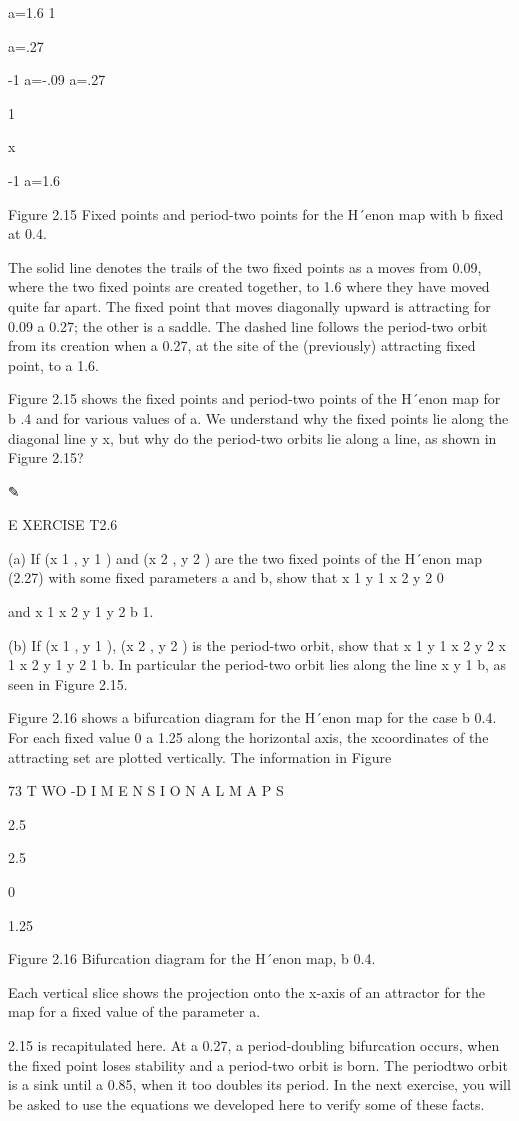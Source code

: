\documentclass[12pt]{article}
\begin{document}
a=1.6 1

a=.27

-1 a=-.09 a=.27

1

x

-1 a=1.6

Figure 2.15 Fixed points and period-two points for the H´enon map with b ﬁxed at 0.4.

The solid line denotes the trails of the two ﬁxed points as a moves from 0.09, where the two ﬁxed points are created together, to 
1.6 where they have moved quite far apart. The ﬁxed point that moves diagonally upward is attracting for 0.09  a  0.27; the other is 
a saddle. The dashed line follows the period-two orbit from its creation when a  0.27, at the site of the (previously) attracting 
ﬁxed point, to a  1.6.

Figure 2.15 shows the ﬁxed points and period-two points of the H´enon map for b  .4 and for various values of a. We understand why 
the ﬁxed points lie along the diagonal line y  x, but why do the period-two orbits lie along a line, as shown in Figure 2.15?

✎

E XERCISE T2.6

(a) If (x 1 , y 1 ) and (x 2 , y 2 ) are the two ﬁxed points of the H´enon map (2.27) with some ﬁxed parameters a and b, show that 
x 1  y 1  x 2  y 2  0

and x 1  x 2  y 1  y 2  b  1.

(b) If  (x 1 , y 1 ), (x 2 , y 2 )  is the period-two orbit, show that x 1  y 1  x 2  y 2  x 1  x 2  y 1  y 2  1  b. In particular 
the period-two orbit lies along the line x  y  1  b, as seen in Figure 2.15.

Figure 2.16 shows a bifurcation diagram for the H´enon map for the case b  0.4. For each ﬁxed value 0 a 1.25 along the horizontal 
axis, the xcoordinates of the attracting set are plotted vertically. The information in Figure

73 T WO -D I M E N S I O N A L M A P S

2.5

2.5

0

1.25

Figure 2.16 Bifurcation diagram for the H´enon map, b  0.4.

Each vertical slice shows the projection onto the x-axis of an attractor for the map for a ﬁxed value of the parameter a.

2.15 is recapitulated here. At a  0.27, a period-doubling bifurcation occurs, when the ﬁxed point loses stability and a period-two 
orbit is born. The periodtwo orbit is a sink until a  0.85, when it too doubles its period. In the next exercise, you will be asked 
to use the equations we developed here to verify some of these facts.
\end{document}
